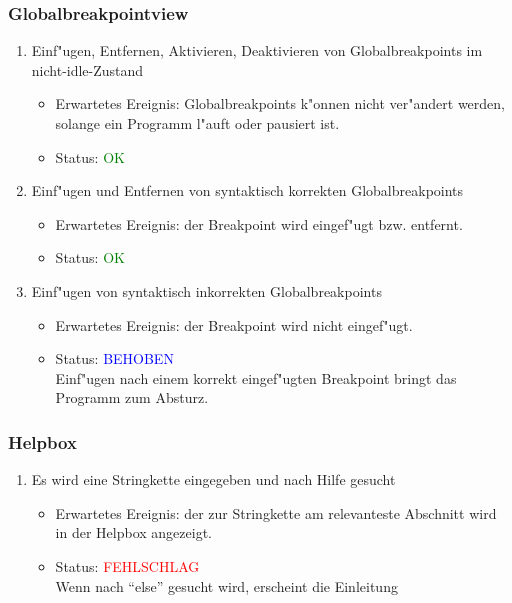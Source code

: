 \subsubsection{Globalbreakpointview}
\begin{enumerate}
\item Einf"ugen, Entfernen, Aktivieren, Deaktivieren von Globalbreakpoints im nicht-idle-Zustand
\begin{itemize}
\item Erwartetes Ereignis: Globalbreakpoints k"onnen nicht ver"andert werden, solange ein Programm l"auft oder pausiert ist. 
\item Status: \textcolor{green}{OK}
\end{itemize}
\item Einf"ugen und Entfernen von syntaktisch korrekten Globalbreakpoints
\begin{itemize}
\item Erwartetes Ereignis: der Breakpoint wird eingef"ugt bzw. entfernt. 
\item Status: \textcolor{green}{OK}
\end{itemize}
\item Einf"ugen von syntaktisch inkorrekten Globalbreakpoints
\begin{itemize}
\item Erwartetes Ereignis: der Breakpoint wird nicht eingef"ugt. 
\item Status: \textcolor{blue}{BEHOBEN} \\
Einf"ugen nach einem korrekt eingef"ugten Breakpoint bringt das Programm zum Absturz.
\end{itemize}
\end{enumerate}
\subsubsection{Helpbox}
\begin{enumerate}
\item Es wird eine Stringkette eingegeben und nach Hilfe gesucht
\begin{itemize}
\item Erwartetes Ereignis: der zur Stringkette am relevanteste Abschnitt wird in der Helpbox angezeigt. 
\item Status: \textcolor{red}{FEHLSCHLAG} \\
Wenn nach "`else"' gesucht wird, erscheint die Einleitung
\end{itemize}
\end{enumerate}

